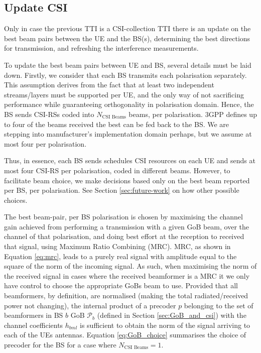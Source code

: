 \subsection{Update CSI}
Only in case the previous \ac{TTI} is a \ac{CSI}-collection \ac{TTI} there is an update on the best beam pairs between the UE and the BS(s), determining the best directions for transmission, and refreshing the interference measurements. 

To update the best beam pairs between UE and BS, several details must be laid down. Firstly, we consider that each BS transmits each polarisation separately. This assumption derives from the fact that at least two independent streams/layers must be supported per UE, and the only way of not sacrificing performance while guaranteeing orthogonality in polarisation domain. Hence, the BS sends CSI-RSs coded into $N_\text{CSI Beams}$ beams, per polarisation. 3GPP defines up to four of the beams received the best can be fed back to the BS. We are stepping into manufacturer's implementation domain perhaps, but we assume at most four per polarisation.

Thus, in essence, each BS sends schedules CSI resources on each UE and sends at most four CSI-RS per polarisation, coded in different beams. However, to facilitate beam choice, we make decisions based only on the best beam reported per BS, per polarisation. See Section \ref{sec:future-work} on how other possible choices.

The best beam-pair, per BS polarisation is chosen by maximising the channel gain achieved from performing a transmission with a given GoB beam, over the channel of that polarisation, and doing best effort at the reception to received that signal, using Maximum Ratio Combining (MRC). MRC, as shown in Equation \eqref{eq:mrc}, leads to a purely real signal with amplitude equal to the square of the norm of the incoming signal. As such, when maximising the norm of the received signal in cases where the received beamformer is a MRC it we only have control to choose the appropriate GoBs beam to use. Provided that all beamformers, by definition, are normalised (making the total radiated/received power not changing), the internal product of a precoder $p$ belonging to the set of beamformers in BS $b$ \ac{GoB} $\mathcal{P}_b$ (defined in Section \ref{sec:GoB_and_csi}) with the channel coefficients $h_{b m l}$ is sufficient to obtain the norm of the signal arriving to each of the UEs antennas. Equation \eqref{eq:GoB_choice} summarises the choice of precoder for the BS for a case where $N_\text{CSI Beams} = 1$.

